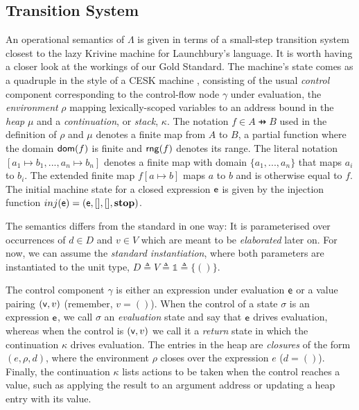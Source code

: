 \subsection{Transition System}

An operational semantics of $Λ$ is given in terms of a small-step transition
system closest to the lazy Krivine machine \cite{AgerDanvyMidtgaard:04} for
Launchbury's language.
It is worth having a closer look at the workings of our Gold Standard.
The machine's state comes as a quadruple in the style of a CESK machine
\cite{Felleisen:87}, consisting of the usual \emph{control} component
corresponding to the control-flow node $γ$ under evaluation, the
\emph{environment} $ρ$ mapping lexically-scoped variables to an address bound in
the \emph{heap} $μ$ and a \emph{continuation}, or \emph{stack}, $κ$.
The notation $f ∈ A \pfun B$ used in the definition of $ρ$ and $μ$ denotes a
finite map from $A$ to $B$, a partial function where the domain $\mathop\mathsf{dom}(f)$ is
finite and $\mathop\mathsf{rng}(f)$ denotes its range.
The literal notation $[a_1↦b_1,...,a_n↦b_n]$ denotes a finite map with domain
$\{a_1,...,a_n\}$ that maps $a_i$ to $b_i$. The extended finite map $f[a ↦ b]$
maps $a$ to $b$ and is otherwise equal to $f$.
The initial machine state for a closed expression $\mathsf{e}$ is given by the
injection function $inj(\mathsf{e}) = (\mathsf{e},[],[],\mathbf{stop})$.

The semantics differs from the standard in one way: It is parameterised over
occurrences of $d ∈ D$ and $v ∈ V$ which are meant to be \emph{elaborated} later
on. For now, we can assume the \emph{standard instantiation}, where both
parameters are instantiated to the unit type, $D \triangleq V \triangleq
\mathbb{1} \triangleq \{ () \}$.

The control component $γ$ is either an expression under evaluation $\mathsf{e}$ or a
value pairing $(\mathsf{v},v)$ (remember, $v = ()$).
When the control of a state $σ$ is an expression $\mathsf{e}$, we call $σ$ an
\emph{evaluation} state and say that $\mathsf{e}$ drives evaluation, whereas when the
control is $(\mathsf{v}, v)$ we call it a \emph{return} state in which the continuation
$κ$ drives evaluation.
The entries in the heap are \emph{closures} of the form $(e,ρ,d)$, where the
environment $ρ$ closes over the expression $e$ ($d = ()$).
Finally, the continuation $κ$ lists actions to be taken when the control reaches
a value, such as applying the result to an argument address or updating a heap
entry with its value.

